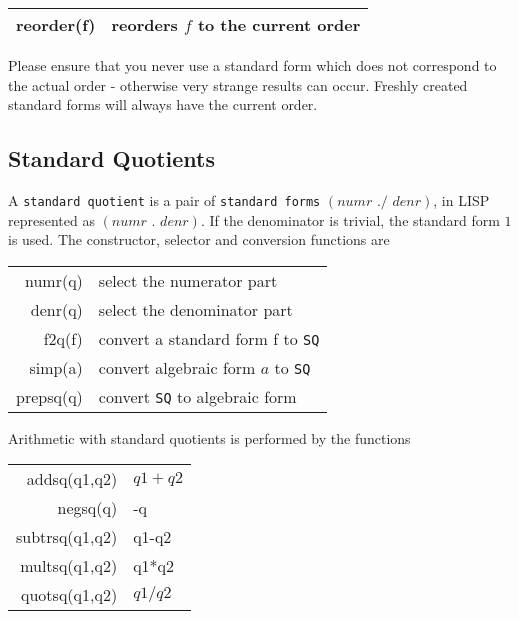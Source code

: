 \begin{center}
\begin{tabular}{|r|l|} \hline
    reorder(f)    & reorders $ f$ to the current order \\ \hline
\end{tabular}
\end{center}

Please ensure that you never use a standard form which does
not correspond to the actual order - otherwise very
strange results can occur. Freshly created standard
forms will always have the current order.

\subsection{Standard Quotients}

A {\tt standard quotient} is a pair of 
{\tt standard forms}
$( numr\,\,./\,\,denr)$, in LISP represented as $(numr\,\,.\,\,denr)$.
If the denominator is trivial, the standard form $1$ is
used. The constructor, selector  and conversion functions are 

\begin{center}
\begin{tabular}{|r|l|} \hline
    numr(q)    & select the numerator part \\ 
    denr(q)    & select the denominator part \\
    f2q(f)      & convert a standard form f to {\tt SQ}\\
    simp(a)     & convert algebraic form $a$ to {\tt SQ}\\
    prepsq(q)   & convert {\tt SQ} to algebraic form\\
\hline
\end{tabular}
\end{center}


Arithmetic with standard quotients is performed by the
functions
\begin{center}
\begin{tabular}{|r|l|} \hline 
    addsq(q1,q2)& $q1 + q2 $\\
    negsq(q)    & -q \\
    subtrsq(q1,q2) & q1-q2 \\
    multsq(q1,q2) & q1*q2 \\
    quotsq(q1,q2) & $q1/q2$ \\
\hline
\end{tabular}
\end{center}

